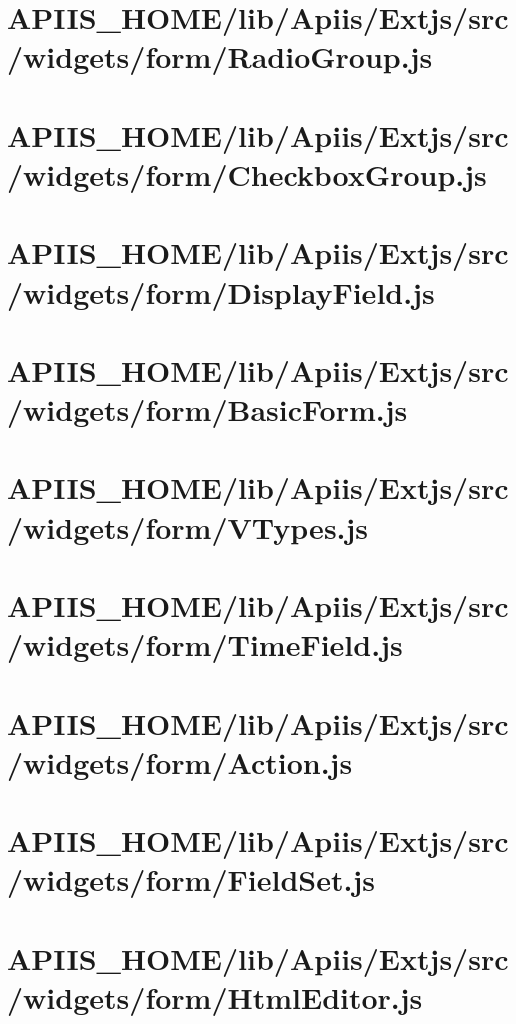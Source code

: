 \section{APIIS\_HOME/lib/Apiis/Extjs/src/widgets/form/RadioGroup.js} 
\section{APIIS\_HOME/lib/Apiis/Extjs/src/widgets/form/CheckboxGroup.js} 
\section{APIIS\_HOME/lib/Apiis/Extjs/src/widgets/form/DisplayField.js} 
\section{APIIS\_HOME/lib/Apiis/Extjs/src/widgets/form/BasicForm.js} 
\section{APIIS\_HOME/lib/Apiis/Extjs/src/widgets/form/VTypes.js} 
\section{APIIS\_HOME/lib/Apiis/Extjs/src/widgets/form/TimeField.js} 
\section{APIIS\_HOME/lib/Apiis/Extjs/src/widgets/form/Action.js} 
\section{APIIS\_HOME/lib/Apiis/Extjs/src/widgets/form/FieldSet.js} 
\section{APIIS\_HOME/lib/Apiis/Extjs/src/widgets/form/HtmlEditor.js} 
